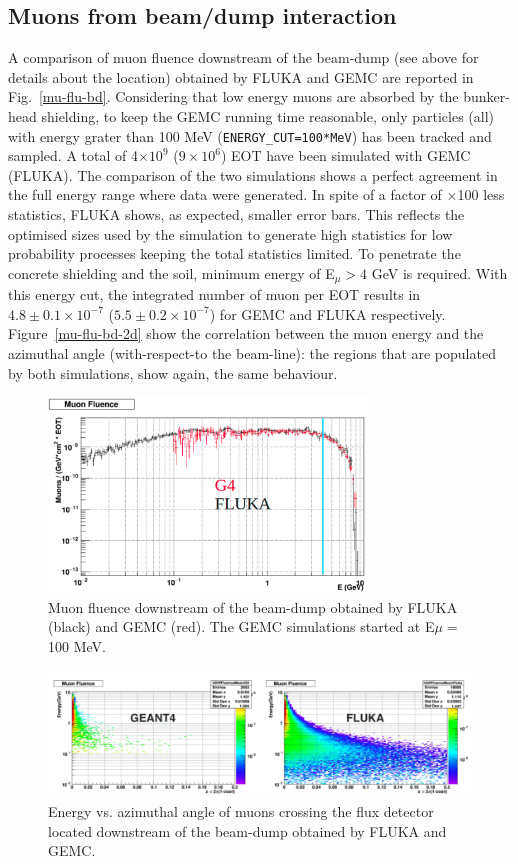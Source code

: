 \subsection{Muons from beam/dump interaction}
A comparison of muon fluence downstream of the beam-dump (see above for details about the location)
obtained by FLUKA and GEMC are reported in Fig.~\ref{mu-flu-bd}. Considering that low energy muons are absorbed by the bunker-head shielding, to keep the GEMC running time reasonable, only particles (all) with energy grater than 100 MeV ({\tt ENERGY\_CUT=100*MeV}) has been tracked and sampled. A total of 4$\times10^9$ ($9\times 10^6$) EOT have been simulated with GEMC (FLUKA). The comparison of the two simulations shows a perfect agreement in the full energy range where data were generated.
In spite of a factor of $\times$100  less statistics, FLUKA shows, as expected, smaller error bars. This reflects the optimised sizes used by the simulation to generate high statistics for low probability processes keeping the total statistics limited.
To penetrate  the concrete shielding and the soil,  minimum energy of  E$_\mu>4$ GeV is required. With this energy cut,   the integrated number of muon per EOT results in $4.8\pm 0.1 \times 10^{-7}$ ($5.5\pm 0.2 \times 10^{-7}$) for GEMC and FLUKA respectively.
Figure~\ref{mu-flu-bd-2d} show the correlation between the muon energy and the azimuthal angle (with-respect-to the beam-line): the regions that are populated by both simulations, show again, the same behaviour.

\begin{figure}[h!] 
\center
\includegraphics[width=8.5cm]{figs/mu-flu-bd.pdf}
\caption{Muon fluence downstream of the beam-dump obtained by FLUKA (black) and GEMC (red). The GEMC simulations started at E$\mu=$100 MeV.}
\label{fig:mu-flu-bd}
\end{figure}

\begin{figure}[h!] 
\center
\includegraphics[width=16cm]{figs/mu-flu-bd-2d.pdf} 
\caption{Energy vs. azimuthal angle of muons crossing the flux detector located downstream of the beam-dump obtained by FLUKA  and GEMC.}
\label{fig:mu-flu-bd-2d}
\end{figure}


